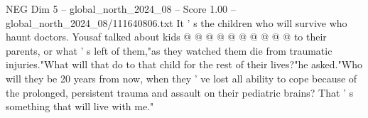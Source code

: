\begin{textsample}{NEG Dim 5 – global\_north\_2024\_08 – Score 1.00 – global\_north\_2024\_08/111640806.txt}
It ' s the children who will survive who haunt doctors.
Yousaf talked about kids @ @ @ @ @ @ @ @ @ @ to their parents, or what ' s left of them,"as they watched them die from traumatic injuries."What will that do to that child for the rest of their lives?"he asked."Who will they be 20 years from now, when they ' ve lost all ability to cope because of the prolonged, persistent trauma and assault on their pediatric brains?
That ' s something that will live with me."

\end{textsample}
